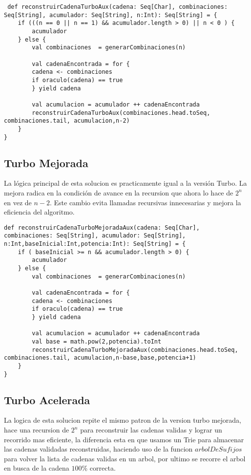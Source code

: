 \documentclass[conference]{IEEEtran}
\begin{document}
\begin{lstlisting}
 def reconstruirCadenaTurboAux(cadena: Seq[Char], combinaciones: Seq[String], acumulador: Seq[String], n:Int): Seq[String] = {
    if (((n == 0 || n == 1) && acumulador.length > 0) || n < 0 ) {
        acumulador
    } else {
        val combinaciones  = generarCombinaciones(n)
                
        val cadenaEncontrada = for {
        cadena <- combinaciones
        if oraculo(cadena) == true
        } yield cadena
            
        val acumulacion = acumulador ++ cadenaEncontrada
        reconstruirCadenaTurboAux(combinaciones.head.toSeq, combinaciones.tail, acumulacion,n-2)
    }
}
\end{lstlisting}

\subsection{\textbf{Turbo Mejorada}}
La lógica principal de esta solucion es practicamente igual a la versión Turbo. La mejora radica en la condición de avance en la recursion que ahora lo hace de $2^n$ en vez de $n-2$. Este cambio evita llamadas recursivas innecesarias y mejora la eficiencia del algoritmo.

\newpage
\begin{lstlisting}
def reconstruirCadenaTurboMejoradaAux(cadena: Seq[Char], combinaciones: Seq[String], acumulador: Seq[String], n:Int,baseInicial:Int,potencia:Int): Seq[String] = {
    if ( baseInicial >= n && acumulador.length > 0) {
        acumulador
    } else {
        val combinaciones  = generarCombinaciones(n)
                
        val cadenaEncontrada = for {
        cadena <- combinaciones
        if oraculo(cadena) == true
        } yield cadena
            
        val acumulacion = acumulador ++ cadenaEncontrada
        val base = math.pow(2,potencia).toInt
        reconstruirCadenaTurboMejoradaAux(combinaciones.head.toSeq, combinaciones.tail, acumulacion,n-base,base,potencia+1)
    }
}

\end{lstlisting}

\subsection{\textbf{Turbo Acelerada}}

La logica de esta solucion repite el mismo patron de la version turbo mejorada, hace una recursion de $2^n$ para reconstruir las cadenas validas y lograr un recorrido mas eficiente, la diferencia esta en que usamos un Trie para almacenar las cadenas validadas reconstruidas, haciendo uso de la funcion $arbolDeSufijos$ para volver la lista de cadenas validas en un arbol, por ultimo se recorre el arbol en busca de la cadena $100$\% correcta.
\end{document}
